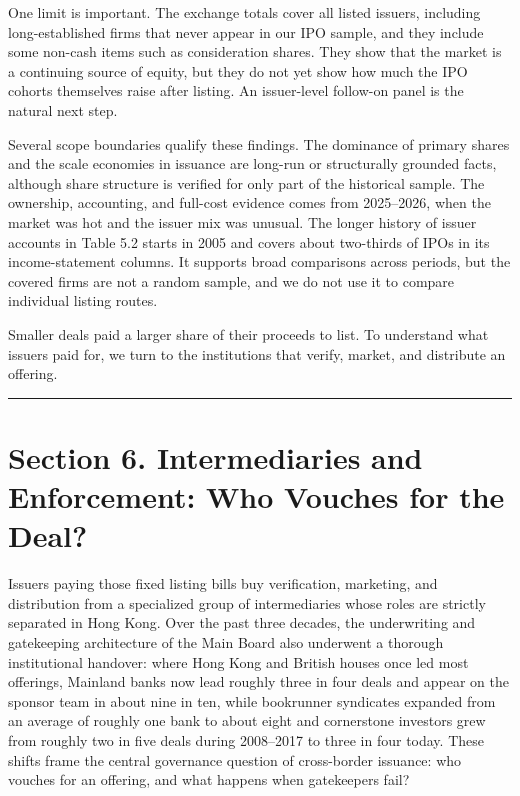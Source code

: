 \documentclass[11pt,letterpaper]{article}
\begin{document}
One limit is important. The exchange totals cover all listed issuers, including long-established firms that never appear in our IPO sample, and they include some non-cash items such as consideration shares. They show that the market is a continuing source of equity, but they do not yet show how much the IPO cohorts themselves raise after listing. An issuer-level follow-on panel is the natural next step.

Several scope boundaries qualify these findings. The dominance of primary shares and the scale economies in issuance are long-run or structurally grounded facts, although share structure is verified for only part of the historical sample. The ownership, accounting, and full-cost evidence comes from 2025–2026, when the market was hot and the issuer mix was unusual. The longer history of issuer accounts in Table 5.2 starts in 2005 and covers about two-thirds of IPOs in its income-statement columns. It supports broad comparisons across periods, but the covered firms are not a random sample, and we do not use it to compare individual listing routes.

Smaller deals paid a larger share of their proceeds to list. To understand what issuers paid for, we turn to the institutions that verify, market, and distribute an offering.

\par\medskip\noindent\rule{\linewidth}{0.35pt}\par\medskip
\section*{\texorpdfstring{Section 6. Intermediaries and Enforcement: Who Vouches for the Deal?}{Section 6. Intermediaries and Enforcement: Who Vouches for the Deal?}}
Issuers paying those fixed listing bills buy verification, marketing, and distribution from a specialized group of intermediaries whose roles are strictly separated in Hong Kong. Over the past three decades, the underwriting and gatekeeping architecture of the Main Board also underwent a thorough institutional handover: where Hong Kong and British houses once led most offerings, Mainland banks now lead roughly three in four deals and appear on the sponsor team in about nine in ten, while bookrunner syndicates expanded from an average of roughly one bank to about eight and cornerstone investors grew from roughly two in five deals during 2008–2017 to three in four today. These shifts frame the central governance question of cross-border issuance: who vouches for an offering, and what happens when gatekeepers fail?
\end{document}
